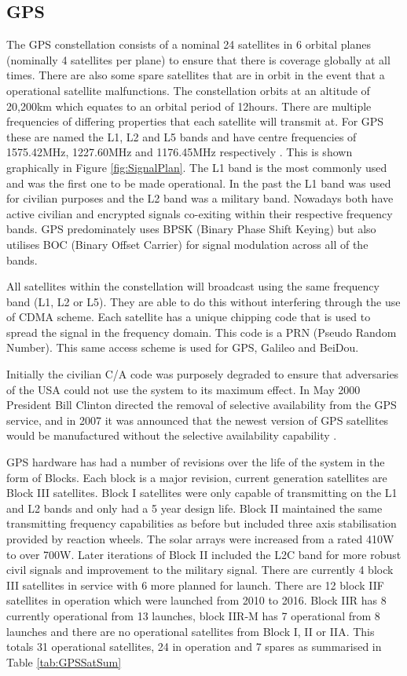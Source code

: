 \subsection{GPS} \label{subsec:GNSS_GPSIntro}
The GPS constellation consists of a nominal 24 satellites in 6 orbital planes (nominally 4 satellites per plane) to ensure that there is coverage globally at all times.
There are also some spare satellites that are in orbit in the event that a operational satellite malfunctions. The constellation orbits at an altitude of 20,200km which
equates to an orbital period of 12hours. There are multiple frequencies of differing properties that each satellite will transmit at. For GPS these are named the L1, L2
and L5 bands and have centre frequencies of 1575.42MHz, 1227.60MHz and 1176.45MHz respectively \cite{RN49}. This is shown graphically in Figure \ref{fig:SignalPlan}. The
L1 band is the most commonly used and was the first one to be made operational. In the past the L1 band was used for civilian purposes and the L2 band was a military
band. Nowadays both have active civilian and encrypted signals co-exiting within their respective frequency bands. GPS predominately uses BPSK (Binary Phase Shift Keying)
but also utilises BOC (Binary Offset Carrier) for signal modulation across all of the bands. 

All satellites within the constellation will broadcast using the same frequency band (L1, L2 or L5). They are able to do this without interfering through the use of CDMA
scheme. Each satellite has a unique chipping code that is used to spread the signal in the frequency domain. This code is a PRN (Pseudo Random Number). This same access
scheme is used for GPS, Galileo and BeiDou.

Initially the civilian C/A code was purposely degraded to ensure that adversaries of the USA could not use the system to its maximum effect. In May 2000 President Bill
Clinton directed the removal of selective availability from the GPS service, and in 2007 it was announced that the newest version of GPS satellites would be manufactured
without the selective availability capability \cite{RN62} \cite{RN64}.

GPS hardware has had a number of revisions over the life of the system in the form of Blocks. Each block is a major revision, current generation satellites are Block III
satellites. Block I satellites were only capable of transmitting on the L1 and L2 bands and only had a 5 year design life. Block II maintained the same transmitting
frequency capabilities as before but included three axis stabilisation provided by reaction wheels. The solar arrays were increased from a rated 410W to over 700W. Later
iterations of Block II included the L2C band for more robust civil signals and improvement to the military signal.
There are currently 4 block III satellites in service with 6 more planned for launch. There are 12 block IIF satellites in operation which were launched from
2010 to 2016. Block IIR has 8 currently operational from 13 launches, block IIR-M has 7 operational from 8 launches and there are no operational satellites from Block I,
II or IIA. This totals 31 operational satellites, 24 in operation and 7 spares as summarised in Table \ref{tab:GPSSatSum}

